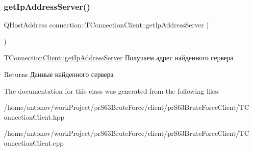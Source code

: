\subsubsection{\texorpdfstring{get\+Ip\+Address\+Server()}{getIpAddressServer()}}
{\footnotesize\ttfamily Q\+Host\+Address connection\+::\+T\+Connection\+Client\+::get\+Ip\+Address\+Server (\begin{DoxyParamCaption}{ }\end{DoxyParamCaption})}



\hyperlink{classconnection_1_1_t_connection_client_a00738647cc6afff4d98185faa375ddb4}{T\+Connection\+Client\+::get\+Ip\+Address\+Server} Получаем адрес найденного сервера 

\begin{DoxyReturn}{Returns}
Данные найденного сервера 
\end{DoxyReturn}


The documentation for this class was generated from the following files\+:\begin{DoxyCompactItemize}
\item 
/home/antonov/work\+Project/pr\+S63\+Brute\+Force/client/pr\+S63\+Brute\+Force\+Client/T\+Connection\+Client.\+hpp\item 
/home/antonov/work\+Project/pr\+S63\+Brute\+Force/client/pr\+S63\+Brute\+Force\+Client/T\+Connection\+Client.\+cpp\end{DoxyCompactItemize}
